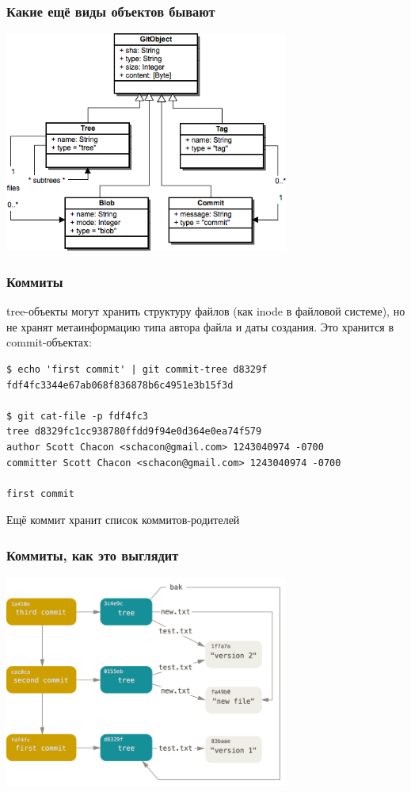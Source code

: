 \documentclass{../mcsslides}
\begin{document}
    \begin{frame}
        \frametitle{Какие ещё виды объектов бывают}
        \begin{center}
            \includegraphics[width=0.7\textwidth]{gitDataStructure.png}
        \end{center}
    \end{frame}

    \begin{frame}[fragile]
        \frametitle{Коммиты}
        tree-объекты могут хранить структуру файлов (как inode в файловой системе), но не хранят метаинформацию типа автора файла и даты создания. Это хранится в commit-объектах:
        \begin{verbatim}
$ echo 'first commit' | git commit-tree d8329f
fdf4fc3344e67ab068f836878b6c4951e3b15f3d

$ git cat-file -p fdf4fc3
tree d8329fc1cc938780ffdd9f94e0d364e0ea74f579
author Scott Chacon <schacon@gmail.com> 1243040974 -0700
committer Scott Chacon <schacon@gmail.com> 1243040974 -0700

first commit
        \end{verbatim}
        Ещё коммит хранит список коммитов-родителей
    \end{frame}

    \begin{frame}
        \frametitle{Коммиты, как это выглядит}
        \begin{center}
            \includegraphics[width=0.7\textwidth]{gitCommitObjects.png}
        \end{center}
    \end{frame}
\end{document}
